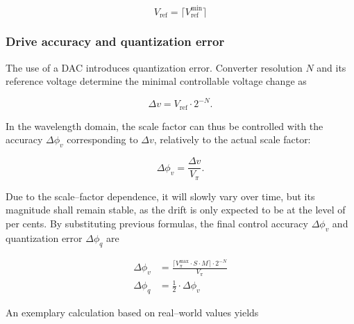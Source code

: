 \documentclass[journal,twoside,web]{ieeecolor}
\begin{document}
\begin{equation}
    V_{\text{ref}} = \lceil V_{\text{ref}}^{\text{min}} \rceil
    \label{eq:reference_voltage_ceil}
\end{equation}

\subsubsection{Drive accuracy and quantization error}
The use of a DAC introduces quantization error. Converter resolution $N$ and its reference voltage determine the minimal controllable voltage change as

\begin{equation}
    \Delta{}v = V_{\text{ref}} \cdot 2^{-N} \text{.}
    \label{eq:dac_voltage_resolution}
\end{equation}

\noindent
In the wavelength domain, the scale factor can thus be controlled with the accuracy $\Delta\phi_{v}$ corresponding to $\Delta{}v$, relatively to the actual scale factor:

\begin{equation}
    \Delta\phi_{v} = \frac{\Delta{}v}{V_\pi} \text{.}
    \label{eq:relative_scale_factor_error}
\end{equation}

\noindent
Due to the scale--factor dependence, it will slowly vary over time, but its magnitude shall remain stable, as the drift is only expected to be at the level of per cents. By substituting previous formulas, the final control accuracy $\Delta\phi_{v}$ and quantization error $\Delta\phi_{q}$ are

\begin{equation}
    \begin{split}
        \Delta\phi_{v} & = \frac{\lceil V_{\pi}^{\text{max}} \cdot S \cdot M \rceil \cdot 2^{-N}}{V_{\pi}} \\
        \Delta\phi_{q} & = \frac{1}{2} \cdot \Delta\phi_{v}
    \end{split}
    \label{eq:error}
\end{equation}

\noindent
An exemplary calculation based on real--world values yields
\end{document}
